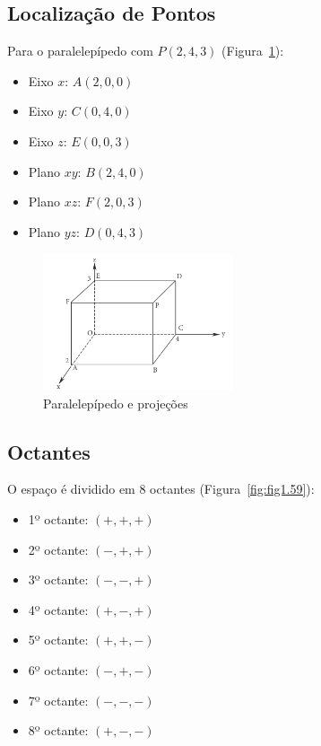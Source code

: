\subsection{Localização de Pontos}

Para o paralelepípedo com $P(2,4,3)$ (Figura~\ref{fig:fig1.56}):

\begin{itemize}
  \item Eixo $x$: $A(2,0,0)$
  \item Eixo $y$: $C(0,4,0)$
  \item Eixo $z$: $E(0,0,3)$
  \item Plano $xy$: $B(2,4,0)$
  \item Plano $xz$: $F(2,0,3)$
  \item Plano $yz$: $D(0,4,3)$
\end{itemize}

\begin{figure}[H]
  \centering
  \includegraphics[width=0.5\textwidth]{./fig/fig1.56.png}
  \caption{Paralelepípedo e projeções}
  \label{fig:fig1.56}
\end{figure}

\subsection{Octantes}

O espaço é dividido em 8 octantes (Figura~\ref{fig:fig1.59}):

\begin{itemize}
  \item 1º octante: $(+,+,+)$
  \item 2º octante: $(-,+,+)$
  \item 3º octante: $(-,-,+)$
  \item 4º octante: $(+,-,+)$
  \item 5º octante: $(+,+,-)$
  \item 6º octante: $(-,+,-)$
  \item 7º octante: $(-,-,-)$
  \item 8º octante: $(+,-,-)$
\end{itemize}

